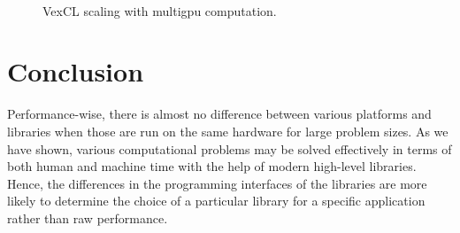 \documentclass[final]{siamltex}
\begin{document}
\begin{figure}
    \begin{center}
        $\;$
        $\;$
    \end{center}
    \caption{VexCL scaling with multigpu computation.}
    \label{fig:scaling}
\end{figure}


%
%
\section{Conclusion}

Performance-wise, there is almost no difference between various platforms and
libraries when those are run on the same hardware for large problem sizes.
As we have shown, various
computational problems may be solved effectively in terms of both human and
machine time with the help of modern high-level libraries. Hence, the
differences in the programming interfaces of the libraries are more likely to 
determine the choice of a particular library for a specific application rather than raw performance.
\end{document}
